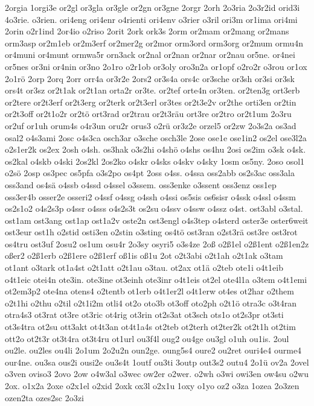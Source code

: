 {2orgia
1orgi3e
or2gl
or3gla
or3gle
or2gn
or3gne
2orgr
2orh
2o3ria
2o3r2id
orid3i
4o3rie.
o3rien.
ori4eng
ori4enr
o4rienti
ori4env
o3rier
o3ril
ori3m
or1ima
ori4mi
2orin
o2r1ind
2or4io
o2riso
2orit
2ork
ork3s
2orm
or2mam
or2mang
or2mans
orm3asp
or2m1eb
or2m3erf
or2mer2g
or2mor
orm3ord
orm3org
or2mum
ormu4n
or4muni
or4munt
ormwa5r
orn3ack
or2nal
or2nan
or2nar
or2nau
or5ne.
or4nei
or5nes
or3ni
or4nin
or3no
2o1ro
o2r1ob
or3oly
oro3n2a
or1opf
o2ro2r
o3rou
or1ox
2o1rö
2orp
2orq
2orr
orr4a
or3r2e
2ors2
or3s4a
ors4c
or3sche
or3sh
or3si
or3sk
ors4t
or3sz
or2t1ak
or2t1an
orta2r
or3te.
or2tef
orte4n
or3ten.
or2ten3g
ort3erb
or2tere
or2t3erf
or2t3erg
or2terk
or2t3erl
or3tes
or2t3e2v
or2the
orti3en
or2tin
or2t3off
or2t1o2r
or2tö
ort3rad
or2trau
or2t3räu
ort3re
or2tro
or2t1um
2o3ru
or2uf
or1uh
orum4s
o4r3un
oru2r
orus3
o2rü
or3z2e
orzel5
or2zw
2o3s2a
os3ad
osal2
o4s3ami
2osc
o4s3ca
osch3ar
o3sche
osch3le
2ose
ose1e
ose1in2
os2el
ose3l2a
o2s1er2k
os2ex
2osh
o4sh.
os3hak
o3s2hi
o4shö
o4shs
os4hu
2osi
os2im
o3sk
o4sk.
os2kal
o4skb
o4ski
2os2kl
2os2ko
o4skr
o4sks
o4skv
o4sky
1osm
os5ny.
2oso
osol1
o2sö
2osp
os3pec
os5pfa
o3s2po
os4pt
2oss
o4ss.
o4ssa
oss2abb
os2s3ac
oss3ala
oss3and
os4sä
o4ssb
o4ssd
o4ssel
o3ssem.
oss3enke
o3ssent
oss3enz
oss1ep
oss3er4b
osser2e
osseri2
o4ssf
o4ssg
o4ssh
o4ssi
os5sis
os6sisr
o4ssk
o4ssl
o4ssm
os2s1o2
o4s2s3p
o4ssr
o4sss
o4s2s3t
os2su
o4ssv
o4ssw
o4ssz
o4st.
ost3abl
o3stal.
ost1am
ost3ang
ost1ap
ost1a2v
oste2n
ost3engl
o4s3tep
o4sterd
oster3e
oster6weit
ost3eur
ost1h
o2stid
osti3en
o2stin
o3sting
os4tö
ost3ran
o2st3rä
ost3re
ost3rot
os4tru
ost3uf
2osu2
os1um
osu4r
2o3sy
osyri5
o3s4ze
2oß
o2ß1el
o2ß1ent
o2ß1en2z
oßer2
o2ß1erb
o2ß1ere
o2ß1erf
oß1is
oß1u
2ot
o2t3abi
o2t1ah
o2t1ak
o3tam
ot1ant
o3tark
ot1a4st
o2t1att
o2t1au
o3tau.
ot2ax
ot1ä
o2teb
ote1i
o4t1eib
o4t1eic
otei4n
ote3in.
ote3ine
ot3einh
ote3inr
o4t1eis
ot2el
ote4l1a
o3tem
o4t1emi
ot2em3p2
ote4na
otens4
o2tentb
ot1erb
o4t1er2l
o4t1erw
ot4es
ot2har
o2them
o2t1hi
o2thu
o2til
o2t1i2m
otli4
ot2o
oto3b
ot3off
oto2ph
o2t1ö
otra3c
o3t4ran
otra4s3
ot3rat
ot3re
ot3ric
ot4rig
ot3rin
ot2s3at
ot3sch
ots1o
ot2s3pr
ot3sti
ot3s4tra
ot2su
ott3akt
ot4t3an
ot4t1a4s
ot2teb
ot2terh
ot2ter2k
ot2t1h
ot2tim
ott2o
ot2t3r
ot3t4ra
ot3t4ru
ot1url
ou3f4l
oug2
ou4ge
ou3gl
o1uh
ou1is.
2oul
ou2le.
ou2les
ou4li
2o1um
2o2u2n
oun2ge.
oung5s4
oure2
ou2ret
ouri4e4
ourme4
our4ne.
ou3sa
ous2i
ousi2e
ou3s4t
1outf
ou3ti
3outp
out3s2
outu4
2o1ü
ov2a
2ovel
o3ven
oviso3
2ovo
2ow
o4w3al
o3wec
ow2er
o2wer.
o2wh
o3wi
owi3en
ow4su
o2wu
2ox.
o1x2a
2oxe
o2x1el
o2xid
2oxk
ox3l
o2x1u
1oxy
o1yo
oz2
o3za
1ozea
2o3zen
ozen2ta
ozes2sc
2o3zi
}

